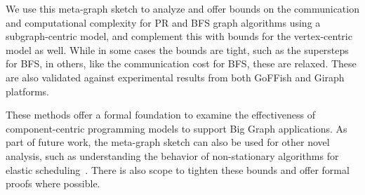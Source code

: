 \documentclass[10pt,conference, compsocconf]{IEEEtran}
\begin{document}
We use this meta-graph sketch to analyze and offer bounds on the communication and computational complexity for PR and BFS graph algorithms using a subgraph-centric model, and complement this with bounds for the vertex-centric model as well. While in some cases the bounds are tight, such as the supersteps for BFS, in others, like the communication cost for BFS, these are relaxed. These are also validated against experimental results from both GoFFish and Giraph platforms.

These methods offer a formal foundation to examine the effectiveness of component-centric programming models to support Big Graph applications.  As part of future work, the meta-graph sketch can also be used for other novel analysis, such as understanding the behavior of non-stationary algorithms for elastic scheduling~\cite{ccgrid}. There is also scope to tighten these bounds and offer formal proofs where possible. 














\footnotesize{

}
\end{document}
